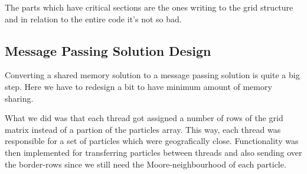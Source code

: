     The parts which have critical sections are the ones writing to the grid
    structure and in relation to the entire code it's not so bad.

    \subsection{Message Passing Solution Design}

    Converting a shared memory solution to a message passing solution is quite a
    big step. Here we have to redesign a bit to have minimum amount of memory
    sharing.

    What we did was that each thread got assigned a number of rows of the grid
    matrix instead of a partion of the particles array. This way, each thread
    was responsible for a set of particles which were geografically close.
    Functionality was then implemented for transferring particles between
    threads and also sending over the border-rows since we still need the
    Moore-neighbourhood of each particle.
